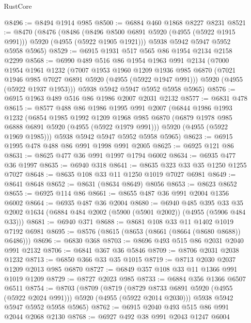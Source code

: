 \begin{lexlean}{RustCore}
\begin{coremodule}
@8496 := @8494 @1914 @985
@8500 := @6884 @460 @1868 @8227 @8231
@8521 := @8470
    (@8476
      (@8486 (@8496 @8500 @6891 @5920 (@4955 (@5922 @1915 @991))) @5920 (@4955 (@5922 @1905 @1921)))
      @5938
      @5942
      @5947
      @5952
      @5958
      @5965)
@8529 := @6915 @1931 @517 @565 @86 @1954 @2134 @2158 @2299
@8568 := @6990
    @489
    @516
    @86
    @1954
    @1963
    @991
    @2134
    (@7000
      @1954
      @1961
      @1232
      (@7007
        @1953
        @1960
        @1209
        @1936
        @985
        @6870
        (@7021 @1946 @985 @7027 @6891 @5920 (@4955 (@5922 @1947 @991)))
        @5920
        (@4955 (@5922 @1937 @1953)))
      @5938
      @5942
      @5947
      @5952
      @5958
      @5965)
@8576 := @6915 @1963 @489 @516 @86 @1986 @2007 @2031 @2132
@8577 := @6831 @478
@8615 := @8577
    @488
    @86
    @1986
    @1995
    @991
    @2007
    (@6844
      @1986
      @1993
      @1232
      (@6854
        @1985
        @1992
        @1209
        @1968
        @985
        @6870
        (@6879 @1978 @985 @6888 @6891 @5920 (@4955 (@5922 @1979 @991)))
        @5920
        (@4955 (@5922 @1969 @1985)))
      @5938
      @5942
      @5947
      @5952
      @5958
      @5965)
@8623 := @6915 @1995 @478 @488 @86 @991 @1998 @991 @2005
@8625 := @6925 @121 @86
@8631 := @8625 @477 @36 @991 @1997 @1794 @6002
@8634 := @6935 @477 @36 @1997
@8635 := @6940 @318
@8641 := @8635 @323 @33 @35 @1250 @1255 @7027
@8648 := @8635 @108 @33 @11 @1250 @1019 @7027 @6981
@8649 := @8641 @8648
@8652 := @8631 (@8634 @8649) @8056
@8653 := @8623 @8652
@8655 := @6925 @114 @86
@8661 := @8655 @487 @36 @991 @2004 @1356 @6002
@8664 := @6935 @487 @36 @2004
@8680 := @6940
    @485
    @395
    @33
    @35
    @2002
    @1634
    (@6884 @484 @2002 (@5900 (@5901 @2002)) (@4955 (@5906 @484 @33)))
@8681 := @6940 @371
@8688 := @8681 @108 @33 @11 @1402 @1019 @7192 @6981
@8695 := @8576 (@8615 (@8653 (@8661 (@8664 (@8680 @8688)) @6486)))
@8696 := @6830 @368
@8703 := @8696 @493 @515 @86 @2031 @2040 @991 @2132
@8706 := @6841 @367 @36 @5846
@8709 := @8706 @2031 @2038 @1232
@8713 := @6850 @366 @33 @35 @1015
@8719 := @8713 @2030 @2037 @1209 @2013 @985 @6870
@8727 := @6849 @357 @108 @33 @11 @1366 @991 @1019 @1209
@8729 := @8727 @2023 @985
@8733 := @6884 @356 @1366 @6507 @6511
@8754 := @8703
    (@8709
      (@8719 (@8729 @8733 @6891 @5920 (@4955 (@5922 @2024 @991))) @5920 (@4955 (@5922 @2014 @2030)))
      @5938
      @5942
      @5947
      @5952
      @5958
      @5965)
@8762 := @6915 @2040 @493 @515 @86 @991 @2044 @2068 @2130
@8768 := @6927 @492 @38 @991 @2043 @1247 @6004

\end{coremodule}
\end{lexlean}
